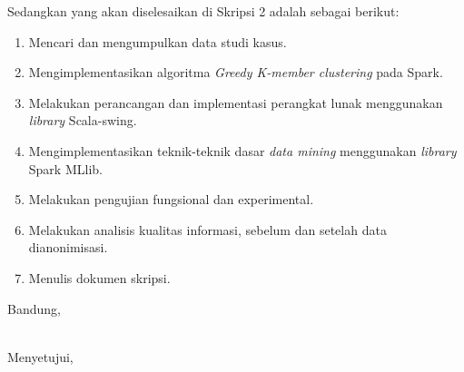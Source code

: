 \documentclass[a4paper,twoside]{article}
\begin{document}
Sedangkan yang akan diselesaikan di Skripsi 2 adalah sebagai berikut:
\begin{enumerate}
\item Mencari dan mengumpulkan data studi kasus.
\item Mengimplementasikan algoritma {\it Greedy K-member clustering } pada Spark.
\item Melakukan perancangan dan implementasi perangkat lunak menggunakan {\it library} Scala-swing.
\item Mengimplementasikan teknik-teknik dasar {\it data mining} menggunakan {\it library}  Spark MLlib.
\item Melakukan pengujian fungsional dan experimental.
\item Melakukan analisis kualitas informasi, sebelum dan setelah data dianonimisasi.
\item Menulis dokumen skripsi.
\end{enumerate}
\newpage
\vspace{1cm}
\centering Bandung, \tanggal\\
\vspace{2cm} \nama \\ 
\vspace{1cm}

Menyetujui, \\
\end{document}
